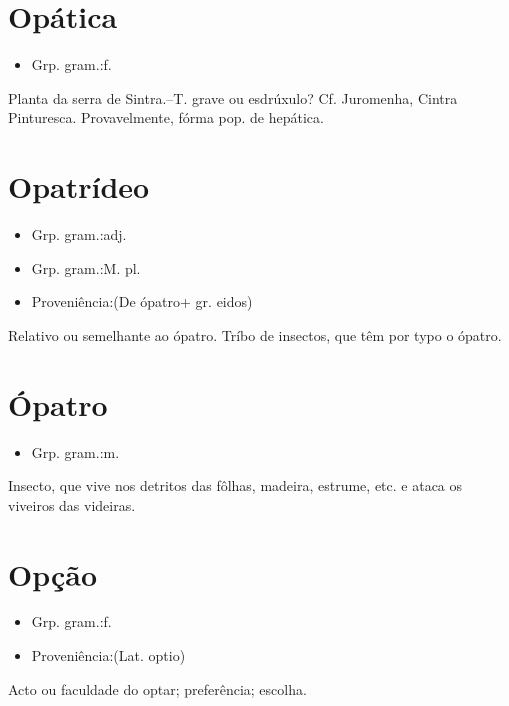 \section{Opática}
\begin{itemize}
\item {Grp. gram.:f.}
\end{itemize}
Planta da serra de Sintra.--T. grave ou esdrúxulo? Cf. Juromenha, \textunderscore Cintra Pinturesca\textunderscore .
Provavelmente, fórma pop. de \textunderscore hepática\textunderscore .
\section{Opatrídeo}
\begin{itemize}
\item {Grp. gram.:adj.}
\end{itemize}
\begin{itemize}
\item {Grp. gram.:M. pl.}
\end{itemize}
\begin{itemize}
\item {Proveniência:(De \textunderscore ópatro\textunderscore  + gr. \textunderscore eidos\textunderscore )}
\end{itemize}
Relativo ou semelhante ao ópatro.
Tríbo de insectos, que têm por typo o ópatro.
\section{Ópatro}
\begin{itemize}
\item {Grp. gram.:m.}
\end{itemize}
Insecto, que vive nos detritos das fôlhas, madeira, estrume, etc. e ataca os viveiros das videiras.
\section{Opção}
\begin{itemize}
\item {Grp. gram.:f.}
\end{itemize}
\begin{itemize}
\item {Proveniência:(Lat. \textunderscore optio\textunderscore )}
\end{itemize}
Acto ou faculdade do optar; preferência; escolha.
